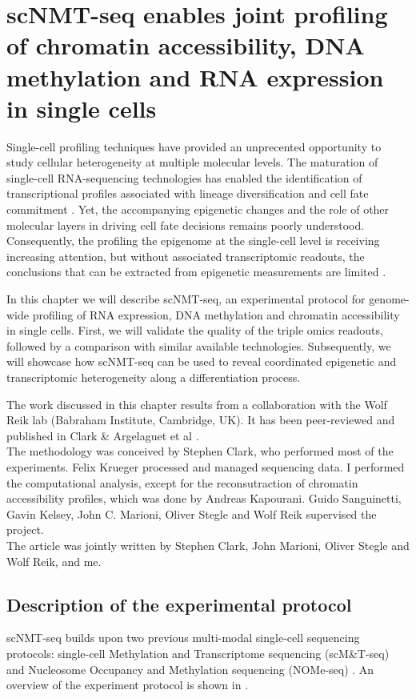 
\section{scNMT-seq enables joint profiling of chromatin accessibility, DNA methylation and RNA expression in single cells}

\graphicspath{{Chapter1/Figs/}}

Single-cell profiling techniques have provided an unprecented opportunity to study cellular heterogeneity at multiple molecular levels. The maturation of single-cell RNA-sequencing technologies has enabled the identification of transcriptional profiles associated with lineage diversification and cell fate commitment \cite{Kolodziejczyk2015,Griffiths2018,Papalexi2017,Patel2014}. Yet, the accompanying epigenetic changes and the role of other molecular layers in driving cell fate decisions remains poorly understood. Consequently, the profiling the epigenome at the single-cell level is receiving increasing attention, but without associated transcriptomic readouts, the conclusions that can be extracted from epigenetic measurements are limited \cite{Stuart2019,Kelsey2017,Griffiths2018}.

In this chapter we will describe scNMT-seq, an experimental protocol for genome-wide profiling of RNA expression, DNA methylation and chromatin accessibility in single cells. First, we will validate the quality of the triple omics readouts, followed by a comparison with similar available technologies. Subsequently, we will showcase how scNMT-seq can be used to reveal coordinated epigenetic and transcriptomic heterogeneity along a differentiation process.

The work discussed in this chapter results from a collaboration with the Wolf Reik lab (Babraham Institute, Cambridge, UK). It has been peer-reviewed and published in Clark \& Argelaguet et al \cite{Clark2018}.\\
The methodology was conceived by Stephen Clark, who performed most of the experiments. Felix Krueger processed and managed sequencing data. I performed the computational analysis, except for the reconsutraction of chromatin accessibility profiles, which was done by Andreas Kapourani. Guido Sanguinetti, Gavin Kelsey, John C. Marioni, Oliver Stegle and Wolf Reik supervised the project.\\
The article was jointly written by Stephen Clark, John Marioni, Oliver Stegle and Wolf Reik, and me.

\subsection{Description of the experimental protocol} \label{section:scnmt_protocol}
scNMT-seq builds upon two previous multi-modal single-cell sequencing protocols: single-cell Methylation and Transcriptome sequencing (scM\&T-seq) \cite{Angermueller2016} and Nucleosome Occupancy and Methylation sequencing (NOMe-seq) \cite{Kelly2012,Pott2016}. An overview of the experiment protocol is shown in .

